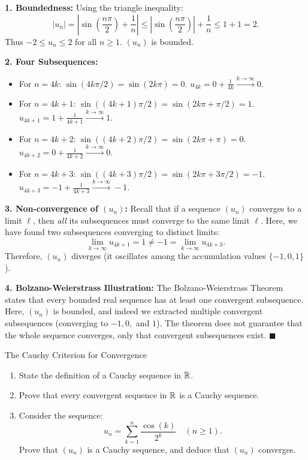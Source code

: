 \begin{solution}
\textbf{1. Boundedness:}
Using the triangle inequality:
\[
|u_n| = \left| \sin\left(\frac{n\pi}{2}\right) + \frac{1}{n} \right| \le \left|\sin\left(\frac{n\pi}{2}\right)\right| + \frac{1}{n} \le 1 + 1 = 2.
\]
Thus $-2 \le u_n \le 2$ for all $n \ge 1$. $(u_n)$ is bounded.

\textbf{2. Four Subsequences:}
\begin{itemize}[leftmargin=1.5em,itemsep=2pt]
  \item For $n = 4k$: $\sin(4k\pi/2) = \sin(2k\pi) = 0$.
  $u_{4k} = 0 + \frac{1}{4k} \xrightarrow{k \to \infty} 0$.
  \item For $n = 4k + 1$: $\sin((4k+1)\pi/2) = \sin(2k\pi + \pi/2) = 1$.
  $u_{4k+1} = 1 + \frac{1}{4k+1} \xrightarrow{k \to \infty} 1$.
  \item For $n = 4k + 2$: $\sin((4k+2)\pi/2) = \sin(2k\pi + \pi) = 0$.
  $u_{4k+2} = 0 + \frac{1}{4k+2} \xrightarrow{k \to \infty} 0$.
  \item For $n = 4k + 3$: $\sin((4k+3)\pi/2) = \sin(2k\pi + 3\pi/2) = -1$.
  $u_{4k+3} = -1 + \frac{1}{4k+3} \xrightarrow{k \to \infty} -1$.
\end{itemize}

\textbf{3. Non-convergence of $(u_n)$:}
Recall that if a sequence $(u_n)$ converges to a limit $\ell$, then \emph{all} its subsequences must converge to the same limit $\ell$.
Here, we have found two subsequences converging to distinct limits:
\[
\lim_{k \to \infty} u_{4k+1} = 1 \ne -1 = \lim_{k \to \infty} u_{4k+3}.
\]
Therefore, $(u_n)$ diverges (it oscillates among the accumulation values $\{-1, 0, 1\}$).

\textbf{4. Bolzano-Weierstrass Illustration:}
The Bolzano-Weierstrass Theorem states that every bounded real sequence has at least one convergent subsequence.
Here, $(u_n)$ is bounded, and indeed we extracted multiple convergent subsequences (converging to $-1, 0,$ and $1$).
The theorem does not guarantee that the whole sequence converges, only that convergent subsequences exist. \hfill $\blacksquare$
\end{solution}

\begin{exercise}{The Cauchy Criterion for Convergence}
\begin{enumerate}[leftmargin=1.5em,itemsep=2pt]
  \item State the definition of a Cauchy sequence in $\mathbb{R}$.
  \item Prove that every convergent sequence in $\mathbb{R}$ is a Cauchy sequence.
  \item Consider the sequence:
  \[
  u_n = \sum_{k=1}^n \frac{\cos(k)}{2^k} \quad (n \ge 1).
  \]
  Prove that $(u_n)$ is a Cauchy sequence, and deduce that $(u_n)$ converges.
\end{enumerate}
\end{exercise}

